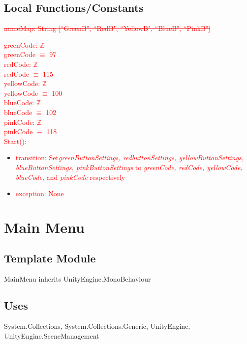 \documentclass[12pt]{article}
\begin{document}
\subsection{Local Functions/Constants}
\textcolor{red}{\sout{nameMap: String [``GreenB", ``RedB", ``YellowB", ``BlueB", ``PinkB"]}}

\noindent \textcolor{red}{greenCode: $\mathbb{Z}$}\\
\textcolor{red}{greenCode $\equiv$ 97}\\
\textcolor{red}{redCode: $\mathbb{Z}$}\\
\textcolor{red}{redCode $\equiv$ 115}\\
\textcolor{red}{yellowCode: $\mathbb{Z}$}\\
\textcolor{red}{yellowCode $\equiv$ 100}\\
\textcolor{red}{blueCode: $\mathbb{Z}$}\\
\textcolor{red}{blueCode $\equiv$ 102}\\
\textcolor{red}{pinkCode: $\mathbb{Z}$}\\
\textcolor{red}{pinkCode $\equiv$ 118}\\

\noindent \textcolor{red}{Start():}
\begin{itemize}
    \item \textcolor{red}{transition: Set\textit{greenButtonSettings, redbuttonSettings, yellowButtonSettings, blueButtonSettings, pinkButtonSettings} to \textit{greenCode, redCode, yellowCode, blueCode,} and \textit{pinkCode} respectively}
    \item \textcolor{red}{exception: None}
\end{itemize}

\newpage
\section{Main Menu}

\subsection{Template Module}
MainMenu inherits UnityEngine.MonoBehaviour

\subsection {Uses}
System.Collections, System.Collections.Generic, UnityEngine, UnityEngine.SceneManagement
\end{document}
